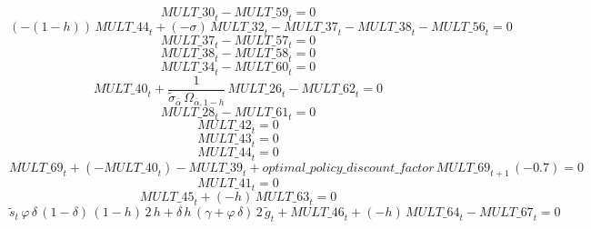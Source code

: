 \begin{dmath}
{MULT\_30}_{t}-{MULT\_59}_{t}=0
\end{dmath}
\begin{dmath}
\left(-\left(1-{{h}}\right)\right)\, {MULT\_44}_{t}+\left(-{{\sigma}}\right)\, {MULT\_32}_{t}-{MULT\_37}_{t}-{MULT\_38}_{t}-{MULT\_56}_{t}=0
\end{dmath}
\begin{dmath}
{MULT\_37}_{t}-{MULT\_57}_{t}=0
\end{dmath}
\begin{dmath}
{MULT\_38}_{t}-{MULT\_58}_{t}=0
\end{dmath}
\begin{dmath}
{MULT\_34}_{t}-{MULT\_60}_{t}=0
\end{dmath}
\begin{dmath}
{MULT\_40}_{t}+\frac{1}{{{\tilde\sigma_{\bar{\alpha}}}}\, {{\Omega_{\bar \alpha,1-h}}}}\, {MULT\_26}_{t}-{MULT\_62}_{t}=0
\end{dmath}
\begin{dmath}
{MULT\_28}_{t}-{MULT\_61}_{t}=0
\end{dmath}
\begin{dmath}
{MULT\_42}_{t}=0
\end{dmath}
\begin{dmath}
{MULT\_43}_{t}=0
\end{dmath}
\begin{dmath}
{MULT\_44}_{t}=0
\end{dmath}
\begin{dmath}
{MULT\_69}_{t}+\left(-{MULT\_40}_{t}\right)-{MULT\_39}_{t}+{optimal\_policy\_discount\_factor}\, {MULT\_69}_{t+1}\, \left(-0.7\right)=0
\end{dmath}
\begin{dmath}
{MULT\_41}_{t}=0
\end{dmath}
\begin{dmath}
{MULT\_45}_{t}+\left(-{{h}}\right)\, {MULT\_63}_{t}=0
\end{dmath}
\begin{dmath}
{{\tilde s}}_{t}\, {{\varphi}}\, {{\delta}}\, \left(1-{{\delta}}\right)\, \left(1-{{h}}\right)\, 2\, {{h}}+{{\delta}}\, {{h}}\, \left({{\gamma}}+{{\varphi}}\, {{\delta}}\right)\, 2\, {{\tilde g}}_{t}+{MULT\_46}_{t}+\left(-{{h}}\right)\, {MULT\_64}_{t}-{MULT\_67}_{t}=0
\end{dmath}
